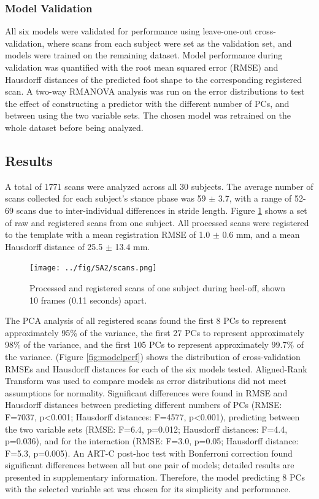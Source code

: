 \documentclass[defaultstyle,11pt]{thesis}
\begin{document}
\hypertarget{model-validation}{%
\subsubsection{Model Validation}\label{model-validation}}

All six models were validated for performance using leave-one-out cross-validation, where scans from each subject were set as the validation set, and models were trained on the remaining dataset.
Model performance during validation was quantified with the root mean squared error (RMSE) and Hausdorff distances of the predicted foot shape to the corresponding registered scan.
A two-way RMANOVA analysis was run on the error distributions to test the effect of constructing a predictor with the different number of PCs, and between using the two variable sets.
The chosen model was retrained on the whole dataset before being analyzed.

\hypertarget{results-1}{%
\subsection{Results}\label{results-1}}

A total of 1771 scans were analyzed across all 30 subjects.
The average number of scans collected for each subject's stance phase was 59 \(\pm\) 3.7, with a range of 52-69 scans due to inter-individual differences in stride length.
Figure \ref{fig:scans} shows a set of raw and registered scans from one subject.
All processed scans were registered to the template with a mean registration RMSE of 1.0 \(\pm\) 0.6 mm, and a mean Hausdorff distance of 25.5 \(\pm\) 13.4 mm.

\begin{figure}
\hypertarget{fig:scans}{%
\centering
\texttt{[image: ../fig/SA2/scans.png]}
\caption{Processed and registered scans of one subject during heel-off, shown 10 frames (0.11 seconds) apart.}\label{fig:scans}
}
\end{figure}

The PCA analysis of all registered scans found the first 8 PCs to represent approximately 95\% of the variance, the first 27 PCs to represent approximately 98\% of the variance, and the first 105 PCs to represent approximately 99.7\% of the variance.
(Figure \ref{fig:modelperf}) shows the distribution of cross-validation RMSEs and Hausdorff distances for each of the six models tested.
Aligned-Rank Transform \citep{Wobbrock2011} was used to compare models as error distributions did not meet assumptions for normality.
Significant differences were found in RMSE and Hausdorff distances between predicting different numbers of PCs (RMSE: F=7037, p\textless0.001; Hausdorff distances: F=4577, p\textless0.001), predicting between the two variable sets (RMSE: F=6.4, p=0.012; Hausdorff distances: F=4.4, p=0.036), and for the interaction (RMSE: F=3.0, p=0.05; Hausdorff distance: F=5.3, p=0.005).
An ART-C post-hoc test \citep{Elkin2021} with Bonferroni correction found significant differences between all but one pair of models; detailed results are presented in supplementary information.
Therefore, the model predicting 8 PCs with the selected variable set was chosen for its simplicity and performance.
\end{document}
